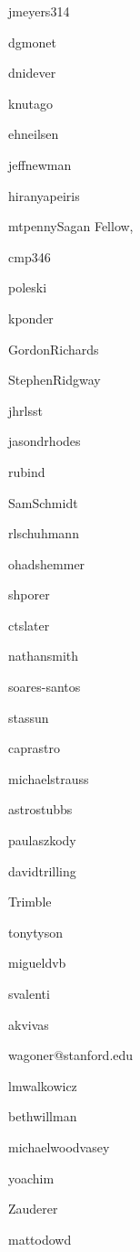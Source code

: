 \author{Josh Meyers}{jmeyers314}{\stanford}
\author{Dave Monet}{dgmonet}{\usno}
\author{David Nidever}{dnidever}{\lsst}
\author{Knut Olsen}{knutago}{\noao}
\author{Eric Neilsen}{ehneilsen}{\somewhere}
\author{Jeffrey Newman}{jeffnewman}{}
\author{Hiranya Peiris}{hiranyapeiris}{\ucl}
\author{Matthew T.\ Penny}{mtpenny}{Sagan Fellow,~\osu}
\author{Christina Peters}{cmp346}{\drexel}
\author{Rados{\l}aw Poleski}{poleski}{\osu}
\author{Kara Ponder}{kponder}{}
\author{Gordon Richards}{GordonRichards}{\drexel}
\author{Stephen Ridgway}{StephenRidgway}{\noao}
\author{Jeonghee Rho}{jhrlsst}{\seti}
\author{Jason Rhodes}{jasondrhodes}{\jpl}
\author{David Rubin}{rubind}{\stsci}
\author{Samuel Schmidt}{SamSchmidt}{\ucd}
\author{Robert Schuhmann}{rlschuhmann}{\ucl}
\author{Ohad Shemmer}{ohadshemmer}{\unt}
\author{Avi Shporer}{shporer}{\jpl}
\author{Colin Slater}{ctslater}{\uw}
\author{Nathan Smith}{nathansmith}{\arizona}
\author{Marcelles Soares-Santos}{soares-santos}{\somewhere}
\author{Keivan Stassun}{stassun}{\vanderbilt}
\author{Jay Strader}{caprastro}{\msu}
\author{Michael Strauss}{michaelstrauss}{\princeton}
\author{Rachel Street}{}{\lcogt}
\author{Christopher Stubbs}{astrostubbs}{\somewhere}
\author{Paula Szkody}{paulaszkody}{\uw}
\author{David Trilling}{davidtrilling}{\somewhere}
\author{Virginia Trimble}{Trimble}{\somewhere}
\author{Tony Tyson}{tonytyson}{\ucd}
\author{Miguel de Val-Borro}{migueldvb}{\princeton}
\author{Stefano Valenti}{svalenti}{\somewhere}
\author{Kathy Vivas}{akvivas}{\ctio}
\author{Robert Wagoner}{wagoner@stanford.edu}{\stanford}
\author{Lucianne Walkowicz}{lmwalkowicz}{\adler}
\author{Beth Willman}{bethwillman}{\lsst}
\author{Michael Wood-Vasey}{michaelwoodvasey}{}
\author{Peter Yoachim}{yoachim}{\somewhere}
\author{Bevin Ashley Zauderer}{Zauderer}{\nyu}
\author{Matt O'Dowd}{mattodowd}{\cuny}
